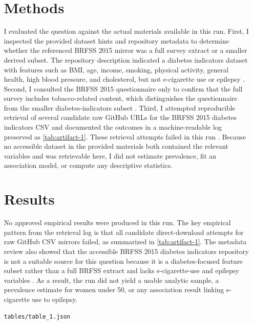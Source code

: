 \documentclass[11pt]{article}
\begin{document}
\section{Methods}
I evaluated the question against the actual materials available in this run. First, I inspected the provided dataset hints and repository metadata to determine whether the referenced BRFSS 2015 mirror was a full survey extract or a smaller derived subset. The repository description indicated a diabetes indicators dataset with features such as BMI, age, income, smoking, physical activity, general health, high blood pressure, and cholesterol, but not e-cigarette use or epilepsy \cite{ref1}. Second, I consulted the BRFSS 2015 questionnaire only to confirm that the full survey includes tobacco-related content, which distinguishes the questionnaire from the smaller diabetes-indicators subset \cite{ref2}. Third, I attempted reproducible retrieval of several candidate raw GitHub URLs for the BRFSS 2015 diabetes indicators CSV and documented the outcomes in a machine-readable log preserved as \ref{tab:artifact-1}. These retrieval attempts failed in this run \cite{ref3}. Because no accessible dataset in the provided materials both contained the relevant variables and was retrievable here, I did not estimate prevalence, fit an association model, or compute any descriptive statistics.

\section{Results}
No approved empirical results were produced in this run. The key empirical pattern from the retrieval log is that all candidate direct-download attempts for raw GitHub CSV mirrors failed, as summarized in \ref{tab:artifact-1}. The metadata review also showed that the accessible BRFSS 2015 diabetes indicators repository is not a suitable source for this question because it is a diabetes-focused feature subset rather than a full BRFSS extract and lacks e-cigarette-use and epilepsy variables \cite{ref1}. As a result, the run did not yield a usable analytic sample, a prevalence estimate for women under 50, or any association result linking e-cigarette use to epilepsy.

\begin{table}[t]
\centering
\caption{Machine-readable log of candidate raw GitHub dataset URLs attempted and the retrieval failure message from this run.}
\label{tab:artifact-1}
\texttt{tables/table\_1.json}
\end{table}
\end{document}
